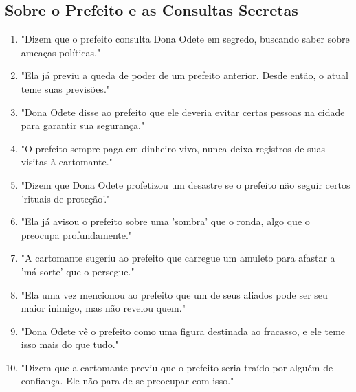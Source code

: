\subsection*{Sobre o Prefeito e as Consultas Secretas}
\begin{enumerate}
    \item "Dizem que o prefeito consulta Dona Odete em segredo, buscando saber sobre ameaças políticas."
    \item "Ela já previu a queda de poder de um prefeito anterior. Desde então, o atual teme suas previsões."
    \item "Dona Odete disse ao prefeito que ele deveria evitar certas pessoas na cidade para garantir sua segurança."
    \item "O prefeito sempre paga em dinheiro vivo, nunca deixa registros de suas visitas à cartomante."
    \item "Dizem que Dona Odete profetizou um desastre se o prefeito não seguir certos 'rituais de proteção'."
    \item "Ela já avisou o prefeito sobre uma 'sombra' que o ronda, algo que o preocupa profundamente."
    \item "A cartomante sugeriu ao prefeito que carregue um amuleto para afastar a 'má sorte' que o persegue."
    \item "Ela uma vez mencionou ao prefeito que um de seus aliados pode ser seu maior inimigo, mas não revelou quem."
    \item "Dona Odete vê o prefeito como uma figura destinada ao fracasso, e ele teme isso mais do que tudo."
    \item "Dizem que a cartomante previu que o prefeito seria traído por alguém de confiança. Ele não para de se preocupar com isso."
\end{enumerate}

